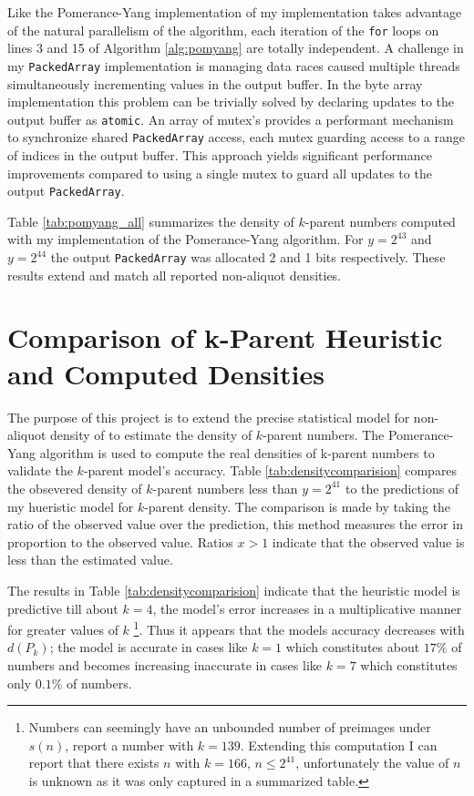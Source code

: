 \documentclass{article}
\theoremstyle{definition}
\begin{document}
Like the Pomerance-Yang implementation of \cite{chum_guy_jacobson_mosunov_2018} my implementation takes advantage of the natural parallelism of the algorithm, each iteration of the \texttt{for} loops on lines 3 and 15 of Algorithm \ref{alg:pomyang} are totally independent. A challenge in my \texttt{PackedArray} implementation is managing data races caused multiple threads simultaneously incrementing values in the output buffer. In the byte array implementation this problem can be trivially solved by declaring updates to the output buffer as \texttt{atomic}. An array of mutex's provides a performant mechanism to synchronize shared \texttt{PackedArray} access, each mutex guarding access to a range of indices in the output buffer. This approach yields significant performance improvements compared to using a single mutex to guard all updates to the output \texttt{PackedArray}.

Table \ref{tab:pomyang_all} summarizes the density of $k$-parent numbers computed with my implementation of the Pomerance-Yang algorithm. For $y  = 2^{43}$ and $y = 2^{44}$ the output \texttt{PackedArray} was allocated 2 and 1 bits respectively. These results extend \cite{chum_guy_jacobson_mosunov_2018} and match all reported non-aliquot densities. 

\section{Comparison of k-Parent Heuristic and Computed Densities}
The purpose of this project is to extend the precise statistical model for non-aliquot density of \cite{pollPom} to estimate the density of $k$-parent numbers. The Pomerance-Yang algorithm is used to compute the real densities of k-parent numbers to validate the $k$-parent model's accuracy. Table \ref*{tab:densitycomparision} compares the obsevered density of $k$-parent numbers less than $y = 2^{41}$ to the predictions of my hueristic model for $k$-parent density. The comparison is made by taking the ratio of the observed value over the prediction, this method measures the error in proportion to the observed value. Ratios $x > 1$  indicate that the observed value is less than the estimated value.

The results in Table \ref*{tab:densitycomparision} indicate that the heuristic model is predictive till about $k = 4$, the model's error increases in a multiplicative manner for greater values of $k$
\footnote{Numbers can seemingly have an unbounded number of preimages under $s(n)$, \cite{chum_guy_jacobson_mosunov_2018} report a number with $k = 139$. Extending this computation I can report that there exists $n$ with $k = 166$, $n \leq 2^{41}$, unfortunately the value of $n$ is unknown as it was only captured in a summarized table.}. Thus it appears that the models accuracy decreases with $d(P_k)$; the model is accurate in cases like $k = 1$ which constitutes about $17\%$ of numbers and becomes increasing inaccurate in cases like $k = 7$ which constitutes only $0.1\%$ of numbers.
\end{document}
